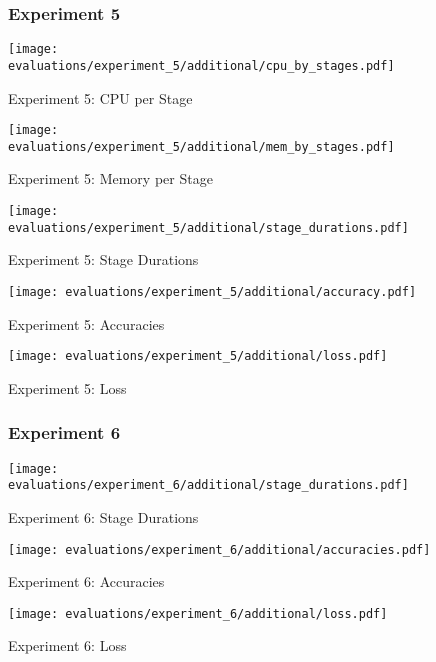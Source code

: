 \begin{figure}[p]
    \subsubsection{Experiment 5}

    \begin{adjustwidth}{-0.2\paperwidth}{-0.2\paperwidth}
        \centering
        \texttt{[image: evaluations/experiment\_5/additional/cpu\_by\_stages.pdf]}
        \caption{Experiment 5: CPU per Stage}
        \label{fig:eval_5_cpu_per_stage}
    \end{adjustwidth}

    \begin{adjustwidth}{-0.2\paperwidth}{-0.2\paperwidth}
        \centering
        \texttt{[image: evaluations/experiment\_5/additional/mem\_by\_stages.pdf]}
        \caption{Experiment 5: Memory per Stage}
        \label{fig:eval_5_memory_per_stage}
    \end{adjustwidth}
\end{figure}

\begin{figure}[p]
    \centering
    \begin{adjustwidth}{-0.2\paperwidth}{-0.2\paperwidth}
        \centering
        \texttt{[image: evaluations/experiment\_5/additional/stage\_durations.pdf]}
        \caption{Experiment 5: Stage Durations}
        \label{fig:eval_5_stage_durations}
    \end{adjustwidth}

    \texttt{[image: evaluations/experiment\_5/additional/accuracy.pdf]}
    \caption{Experiment 5: Accuracies}
    \label{fig:eval_5_accuracies}

    \texttt{[image: evaluations/experiment\_5/additional/loss.pdf]}
    \caption{Experiment 5: Loss}
    \label{fig:eval_5_loss}
\end{figure}

\pagebreak
\begin{figure}[p]

    \subsubsection{Experiment 6}

    \centering
    \begin{adjustwidth}{-0.2\paperwidth}{-0.2\paperwidth}
        \centering
        \texttt{[image: evaluations/experiment\_6/additional/stage\_durations.pdf]}
        \caption{Experiment 6: Stage Durations}
        \label{fig:eval_6_stage_durations}
    \end{adjustwidth}

    \texttt{[image: evaluations/experiment\_6/additional/accuracies.pdf]}
    \caption{Experiment 6: Accuracies}
    \label{fig:eval_6_accuracies}

    \texttt{[image: evaluations/experiment\_6/additional/loss.pdf]}
    \caption{Experiment 6: Loss}
    \label{fig:eval_6_loss}
\end{figure}

